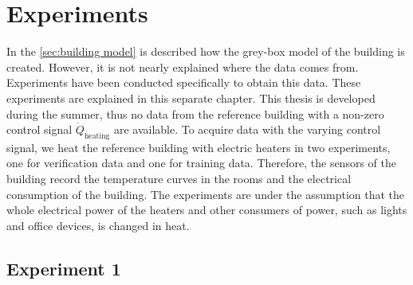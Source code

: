 \chapter{Experiments}
\label{ch:experiments}
In the \autoref{sec:building model} is described how the grey-box model of the building is created. However, it is not nearly explained where the data comes from. Experiments have been conducted specifically to obtain this data. These experiments are explained in this separate chapter. \newline
This thesis is developed during the summer, thus no data from the reference building with a non-zero control signal $\dot{Q}_\text{heating}$ are available. To acquire data with the varying control signal, we heat the reference building with electric heaters in two experiments, one for verification data and one for training data. Therefore, the sensors of the building record the temperature curves in the rooms and the electrical consumption of the building. The experiments are under the assumption that the whole electrical power of the heaters and other consumers of power, such as lights and office devices, is changed in heat.

\section{Experiment 1}
\label{sec:Experiment1}

